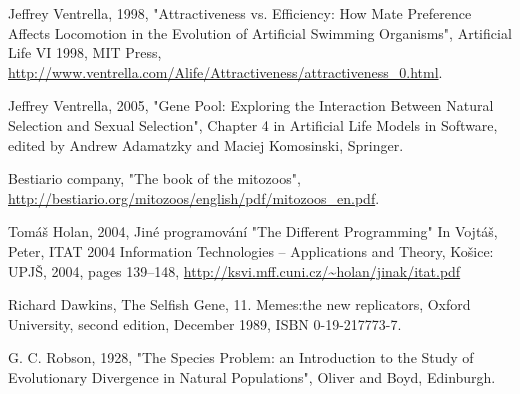 \documentclass[a4paper,12pt]{report}
\begin{document}
\begin{thebibliography}{99}
Jeffrey Ventrella, 1998, "Attractiveness vs. Efficiency: How Mate Preference Affects Locomotion in the Evolution of Artificial Swimming Organisms", Artificial Life VI 1998, MIT Press, \url{http://www.ventrella.com/Alife/Attractiveness/attractiveness_0.html}.
 
Jeffrey Ventrella, 2005, "Gene Pool: Exploring the Interaction Between Natural Selection and Sexual Selection", Chapter 4 in Artificial Life Models in Software, edited by Andrew Adamatzky and Maciej Komosinski, Springer.

Bestiario company, "The book of the mitozoos", \url{http://bestiario.org/mitozoos/english/pdf/mitozoos\_en.pdf}. 

Tom\'{a}\v{s} Holan, 2004, Jiné programování "The Different Programming" In Vojt\'{a}\v{s}, Peter, ITAT 2004 Information Technologies – Applications and Theory, Košice: UPJŠ, 2004, pages 139--148, \url{http://ksvi.mff.cuni.cz/~holan/jinak/itat.pdf}

Richard Dawkins, The Selfish Gene, 11. Memes:the new replicators, Oxford University, second edition, December 1989, ISBN 0-19-217773-7.

G. C. Robson, 1928, "The Species Problem: an Introduction to the Study of Evolutionary Divergence in Natural Populations", Oliver and Boyd, Edinburgh.


\end{thebibliography}
\end{document}
